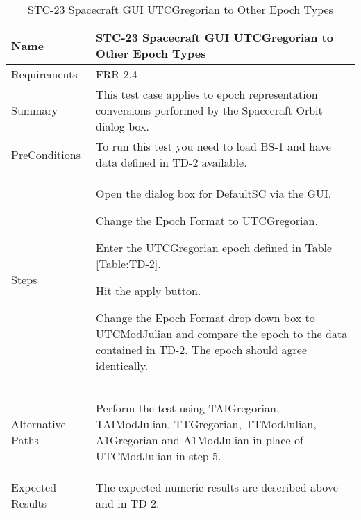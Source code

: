 \begin{table}[htbp!]
\centering
      \begin{tabular}{|p{1.05 in} |p{4.75 in} |}
      \hline
         \rowcolor[rgb]{0.8,0.8,0.8} Name & STC-23 Spacecraft GUI UTCGregorian to Other Epoch Types\\
         \hline
         Requirements & FRR-2.4\\ \hline
         Summary &
         This test case applies to epoch representation conversions performed by the Spacecraft Orbit dialog box.  \\
         \hline
         PreConditions & To run this test you need to load BS-1 and have data defined in TD-2 available.\\
         \hline
         Steps &
         \begin{compactenum}
         \item Open the dialog box for DefaultSC via the GUI.
         \item Change the Epoch Format to UTCGregorian.
         \item Enter the UTCGregorian epoch defined in Table \ref{Table:TD-2}.
         \item Hit the apply button.
         \item Change the Epoch Format drop down box to UTCModJulian and compare the epoch to the
          data contained in TD-2. The epoch should agree identically. 
         \end{compactenum}\\
		 \hline
         Alternative Paths &
         \begin{compactenum}
         \item Perform the test using TAIGregorian, TAIModJulian, TTGregorian, TTModJulian, A1Gregorian
         and A1ModJulian in place of UTCModJulian in step 5.
         \end{compactenum}\\
         \hline
         Expected Results & The expected numeric results are described above and in TD-2.\\
      \hline
\end{tabular}
      \label{Table:STC-23}
      \caption{STC-23 Spacecraft GUI UTCGregorian to Other Epoch Types}
\end{table} 
